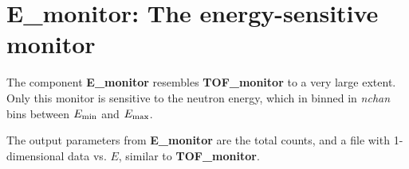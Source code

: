 
\section{E\_monitor: The energy-sensitive monitor} \label{s:e-monitor}

The component {\bf E\_monitor} resembles {\bf TOF\_monitor}
to a very large extent. Only this monitor is sensitive to
the neutron energy, which in binned in \textit{nchan} bins between
$E_{\rm min}$ and $E_{\rm max}$.

The output parameters from {\bf E\_monitor} are the total counts,
and a file with 1-dimensional data vs. $E$, similar to {\bf TOF\_monitor}.


